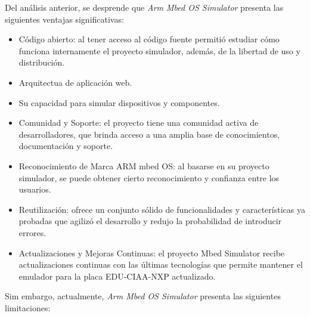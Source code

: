 Del análisis anterior, se desprende que \textit{Arm Mbed OS Simulator} presenta las siguientes ventajas significativas:

\begin{itemize}
	\item Código abierto: al tener acceso al código fuente permitió estudiar cómo funciona internamente el proyecto simulador, además, de la libertad de uso y distribución.
	\item Arquitectua de aplicación web. 
    \item Su capacidad para simular dispositivos y componentes.
	\item Comunidad y Soporte: el proyecto tiene una comunidad activa de desarrolladores, que brinda acceso a una amplia base de conocimientos, documentación y soporte. 
	\item Reconocimiento de Marca ARM mbed OS: al basarse en su proyecto simulador, se puede obtener cierto reconocimiento y confianza entre los usuarios.
	\item Reutilización: ofrece un conjunto sólido de funcionalidades y características ya probadas que agilizó el desarrollo y redujo la probabilidad de introducir errores.
	\item Actualizaciones y Mejoras Continuas: el proyecto Mbed Simulator recibe actualizaciones continuas con las últimas tecnologías que permite mantener el emulador para la placa EDU-CIAA-NXP actualizado.	
\end{itemize}

Sim embargo, actualmente, \textit{Arm Mbed OS Simulator} presenta las siguientes limitaciones:

